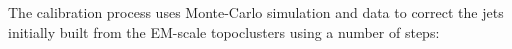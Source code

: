 The calibration process uses Monte-Carlo simulation and data to correct the jets initially
built from the EM-scale topoclusters using a number of steps:

\vspace{-0.5em}
